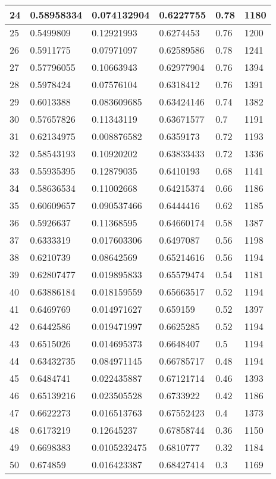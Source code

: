 \begin{longtable}{|l|l|l|l|l|l|}
24 & 0.58958334 & 0.074132904 & 0.6227755 & 0.78 & 1180 \\ \hline 
25 & 0.5499809 & 0.12921993 & 0.6274453 & 0.76 & 1200 \\ \hline 
26 & 0.5911775 & 0.07971097 & 0.62589586 & 0.78 & 1241 \\ \hline 
27 & 0.57796055 & 0.10663943 & 0.62977904 & 0.76 & 1394 \\ \hline 
28 & 0.5978424 & 0.07576104 & 0.6318412 & 0.76 & 1391 \\ \hline 
29 & 0.6013388 & 0.083609685 & 0.63424146 & 0.74 & 1382 \\ \hline 
30 & 0.57657826 & 0.11343119 & 0.63671577 & 0.7 & 1191 \\ \hline 
31 & 0.62134975 & 0.008876582 & 0.6359173 & 0.72 & 1193 \\ \hline 
32 & 0.58543193 & 0.10920202 & 0.63833433 & 0.72 & 1336 \\ \hline 
33 & 0.55935395 & 0.12879035 & 0.6410193 & 0.68 & 1141 \\ \hline 
34 & 0.58636534 & 0.11002668 & 0.64215374 & 0.66 & 1186 \\ \hline 
35 & 0.60609657 & 0.090537466 & 0.6444416 & 0.62 & 1185 \\ \hline 
36 & 0.5926637 & 0.11368595 & 0.64660174 & 0.58 & 1387 \\ \hline 
37 & 0.6333319 & 0.017603306 & 0.6497087 & 0.56 & 1198 \\ \hline 
38 & 0.6210739 & 0.08642569 & 0.65214616 & 0.56 & 1194 \\ \hline 
39 & 0.62807477 & 0.019895833 & 0.65579474 & 0.54 & 1181 \\ \hline 
40 & 0.63886184 & 0.018159559 & 0.65663517 & 0.52 & 1194 \\ \hline 
41 & 0.6469769 & 0.014971627 & 0.659159 & 0.52 & 1397 \\ \hline 
42 & 0.6442586 & 0.019471997 & 0.6625285 & 0.52 & 1194 \\ \hline 
43 & 0.6515026 & 0.014695373 & 0.6648407 & 0.5 & 1194 \\ \hline 
44 & 0.63432735 & 0.084971145 & 0.66785717 & 0.48 & 1194 \\ \hline 
45 & 0.6484741 & 0.022435887 & 0.67121714 & 0.46 & 1393 \\ \hline 
46 & 0.65139216 & 0.023505528 & 0.6733922 & 0.42 & 1186 \\ \hline 
47 & 0.6622273 & 0.016513763 & 0.67552423 & 0.4 & 1373 \\ \hline 
48 & 0.6173219 & 0.12645237 & 0.67858744 & 0.36 & 1150 \\ \hline 
49 & 0.6698383 & 0.0105232475 & 0.6810777 & 0.32 & 1184 \\ \hline 
50 & 0.674859 & 0.016423387 & 0.68427414 & 0.3 & 1169 \\ \hline 
\end{longtable}